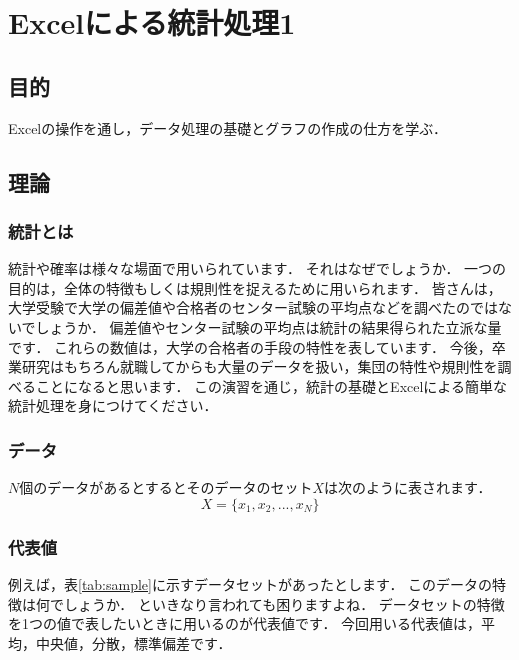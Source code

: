 
\chapter{Excelによる統計処理1}

\section{目的}

Excelの操作を通し，データ処理の基礎とグラフの作成の仕方を学ぶ．

\section{理論}

\subsection{統計とは}

統計や確率は様々な場面で用いられています．
それはなぜでしょうか．
一つの目的は，全体の特徴もしくは規則性を捉えるために用いられます．
皆さんは，大学受験で大学の偏差値や合格者のセンター試験の平均点などを調べたのではないでしょうか．
偏差値やセンター試験の平均点は統計の結果得られた立派な量です．
これらの数値は，大学の合格者の手段の特性を表しています．
今後，卒業研究はもちろん就職してからも大量のデータを扱い，集団の特性や規則性を調べることになると思います．
この演習を通じ，統計の基礎とExcelによる簡単な統計処理を身につけてください．

\subsection{データ}

$N$個のデータがあるとするとそのデータのセット$X$は次のように表されます．
\begin{equation}
    \label{eq:2}
    X = \{x_1, x_2, ..., x_N\}
\end{equation}

\subsection{代表値}

例えば，表\ref{tab:sample}に示すデータセットがあったとします．
このデータの特徴は何でしょうか．
といきなり言われても困りますよね．
データセットの特徴を1つの値で表したいときに用いるのが代表値です．
今回用いる代表値は，平均，中央値，分散，標準偏差です．

